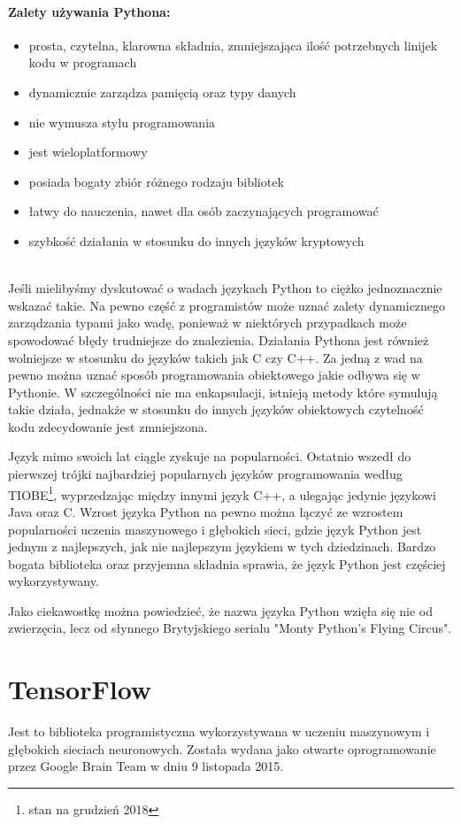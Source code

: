 \documentclass[a4paper,12pt,twoside,openany]{report}
\begin{document}
\paragraph{Zalety używania Pythona:}
\begin{itemize} 
	\item prosta, czytelna, klarowna składnia, zmniejszająca ilość potrzebnych linijek kodu w programach
	\item dynamicznie zarządza pamięcią oraz typy danych
	\item nie wymusza stylu programowania
	\item jest wieloplatformowy
	\item posiada bogaty zbiór różnego rodzaju bibliotek
	\item łatwy do nauczenia, nawet dla osób zaczynających programować
	\item szybkość działania w stosunku do innych języków kryptowych
\end{itemize} 
\mbox{} \\
Jeśli mielibyśmy dyskutować o wadach językach Python to ciężko jednoznacznie wskazać takie. Na pewno część z programistów może uznać zalety dynamicznego zarządzania typami jako wadę, ponieważ w niektórych przypadkach może spowodować błędy trudniejsze do znalezienia. Działania Pythona jest również wolniejsze w stosunku do języków takich jak C czy C++.  Za jedną z wad na pewno można uznać sposób programowania obiektowego jakie odbywa się w Pythonie. W szczególności nie ma enkapsulacji, istnieją metody które symulują takie działa, jednakże w stosunku do innych języków  obiektowych czytelność kodu zdecydowanie jest zmniejszona.

Język mimo swoich lat ciągle zyskuje na popularności. Ostatnio wszedł do pierwszej trójki najbardziej popularnych języków programowania według TIOBE\footnote{stan na grudzień 2018}, wyprzedzając między innymi język C++, a ulegając jedynie językowi Java oraz C. Wzrost języka Python na pewno można łączyć ze wzrostem popularności uczenia maszynowego i głębokich sieci, gdzie język Python jest jednym z najlepszych, jak nie najlepszym językiem w tych dziedzinach. Bardzo bogata biblioteka oraz przyjemna składnia sprawia, że język Python jest częściej wykorzystywany.  

Jako ciekawostkę można powiedzieć, że nazwa języka Python wzięła się nie od zwierzęcia, lecz od słynnego Brytyjskiego serialu "Monty Python’s Flying Circus".

\section{TensorFlow}
Jest to biblioteka programistyczna wykorzystywana w uczeniu maszynowym i głębokich sieciach neuronowych. Została wydana jako otwarte oprogramowanie przez Google Brain Team w dniu 9 listopada 2015.
\end{document}

